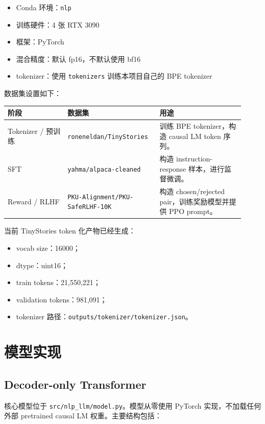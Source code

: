 \documentclass[UTF8,zihao=-4]{ctexart}
\begin{document}
\begin{itemize}
  \item Conda 环境：\texttt{nlp}
  \item 训练硬件：4 张 RTX 3090
  \item 框架：PyTorch
  \item 混合精度：默认 fp16，不默认使用 bf16
  \item tokenizer：使用 \texttt{tokenizers} 训练本项目自己的 BPE tokenizer
\end{itemize}

数据集设置如下：

\begin{longtable}{>{\raggedright\arraybackslash}p{0.24\linewidth}p{0.34\linewidth}p{0.34\linewidth}}
\toprule
\textbf{阶段} & \textbf{数据集} & \textbf{用途} \\
\midrule
Tokenizer / 预训练 & \texttt{roneneldan/TinyStories} & 训练 BPE tokenizer，构造 causal LM token 序列。\\
SFT & \texttt{yahma/alpaca-cleaned} & 构造 instruction-response 样本，进行监督微调。\\
Reward / RLHF & \texttt{PKU-Alignment/PKU-SafeRLHF-10K} & 构造 chosen/rejected pair，训练奖励模型并提供 PPO prompt。\\
\bottomrule
\end{longtable}

当前 TinyStories token 化产物已经生成：

\begin{itemize}
  \item vocab size：16000；
  \item dtype：uint16；
  \item train tokens：21,550,221；
  \item validation tokens：981,091；
  \item tokenizer 路径：\texttt{outputs/tokenizer/tokenizer.json}。
\end{itemize}

\section{模型实现}

\subsection{Decoder-only Transformer}

核心模型位于 \texttt{src/nlp\_llm/model.py}。模型从零使用 PyTorch 实现，不加载任何外部 pretrained causal LM 权重。主要结构包括：
\end{document}
